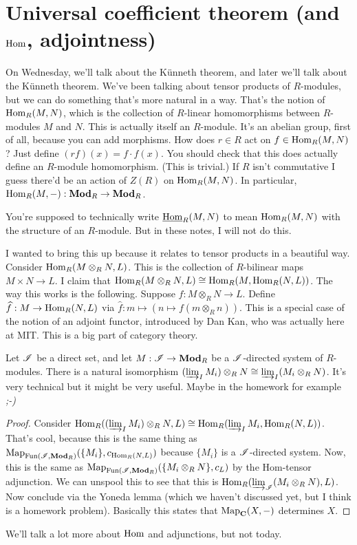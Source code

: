 \section{Universal coefficient theorem (and $\operatorname{Hom}$, adjointness)}
On Wednesday, we'll talk about the K\"{u}nneth theorem, and later we'll talk about the K\"{u}nneth theorem. We've been talking about tensor products of $R$-modules, but we can do something that's more natural in a way. That's the notion of $\operatorname{Hom}_R(M,N)$, which is the collection of $R$-linear homomorphisms between $R$-modules $M$ and $N$. This is actually itself an $R$-module. It's an abelian group, first of all, because you can add morphisms. How does $r\in R$ act on $f\in \operatorname{Hom}_R(M,N)$? Just define $(rf)(x)=f\cdot f(x)$. You should check that this does actually define an $R$-module homomorphism. (This is trivial.) If $R$ isn't commutative I guess there'd be an action of $Z(R)$ on $\operatorname{Hom}_R(M,N)$. In particular, $\operatorname{Hom}_R(M,-):\mathbf{Mod}_R\to\mathbf{Mod}_R$.
\begin{remark}
You're supposed to technically write $\underline{\operatorname{Hom}}_R(M,N)$ to mean $\operatorname{Hom}_R(M,N)$ with the structure of an $R$-module. But in these notes, I will not do this.
\end{remark}
I wanted to bring this up because it relates to tensor products in a beautiful way. Consider $\operatorname{Hom}_R(M\otimes_R N,L)$. This is the collection of $R$-bilinear maps $M\times N\to L$. I claim that $\operatorname{Hom}_R(M\otimes_R N,L)\cong\operatorname{Hom}_R(M,\operatorname{Hom}_R(N,L))$. The way this works is the following. Suppose $f:M\otimes_R N\to L$. Define $\widehat{f}:M\to\operatorname{Hom}_R(N,L)$ via $\widehat{f}:m\mapsto(n\mapsto f(m\otimes_R n))$. This is a special case of the notion of an adjoint functor, introduced by Dan Kan, who was actually here at MIT. This is a big part of category theory.
\begin{prop}
Let $\mathscr I$ be a direct set, and let $M:\mathscr I\to\mathbf{Mod}_R$ be a $\mathscr I$-directed system of $R$-modules. There is a natural isomorphism $(\varinjlim_I M_i)\otimes_R N\cong \varinjlim_I (M_i\otimes_R N)$. It's very technical but it might be very useful. Maybe in the homework for example \emph{;-)}
\end{prop}
\begin{proof}
Consider $\operatorname{Hom}_R((\varinjlim_I M_i)\otimes_R N,L)\cong\operatorname{Hom}_R(\varinjlim_I M_i,\operatorname{Hom}_R(N,L))$. That's cool, because this is the same thing as $\operatorname{Map}_{\operatorname{Fun}(\mathscr I,\mathbf{Mod}_R)}(\{M_i\},c_{\operatorname{Hom}_R(N,L)})$ because $\{M_i\}$ is a $\mathscr I$-directed system. Now, this is the same as $\operatorname{Map}_{\operatorname{Fun}(\mathscr I,\mathbf{Mod}_R)}(\{M_i\otimes_R N\},c_{L})$ by the Hom-tensor adjunction. We can unspool this to see that this is $\operatorname{Hom}_R(\varinjlim_\mathscr I (M_i\otimes_R N),L)$. Now conclude via the Yoneda lemma (which we haven't discussed yet, but I think is a homework problem). Basically this states that $\operatorname{Map}_\mathbf C(X,-)$ determines $X$.
\end{proof}
We'll talk a lot more about $\operatorname{Hom}$ and adjunctions, but not today.

